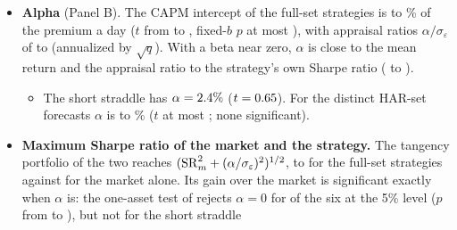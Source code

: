 \begin{itemize}
\begin{itemize}
  \item Over all days the full-set strategies are short the squared half-hour move, $\gamma$ from
    \rhebThirtyTmGammaFullMin{} to \rhebThirtyTmGammaFullMax{} ($t$ from \rhebThirtyTmGammaTFullMin{} to
    \rhebThirtyTmGammaTFullMax), against \rhebThirtyTmGammaShort{} ($t = \rhebThirtyTmGammaTShort$) for the short
    straddle, and they carry no slope on its sign ($\beta$ on $r^{30}_t$ with $t$ at most
    \rhebThirtyBetaTFullMax).
  \end{itemize}
\item \textbf{Alpha} (Panel B). The CAPM intercept of the full-set strategies is \rhebAlphaFullMin{} to
  \rhebAlphaFullMax\% of the premium a day ($t$ from \rhebAlphaTFullMin{} to \rhebAlphaTFullMax, fixed-$b$ $p$ at most
  \rhebAlphaPFullMax), with appraisal ratios $\alpha/\sigma_\varepsilon$ of \rhebARFullMin{} to \rhebARFullMax{}
  (annualized by $\sqrt{q}$). With a beta near zero, $\alpha$ is close to the mean return and the appraisal ratio
  to the strategy's own Sharpe ratio (\rhebSRsFullMin{} to \rhebSRsFullMax).
  \begin{itemize}
  \item The short straddle has $\alpha = 2.4\%$ ($t = 0.65$). For the
    \rhebNHarDistinctWord{} distinct HAR-set forecasts $\alpha$ is \rhebAlphaHarMin{} to \rhebAlphaHarMax\% ($t$ at
    most \rhebAlphaTHarMax; none significant).
  \end{itemize}
\item \textbf{Maximum Sharpe ratio of the market and the strategy.} The tangency portfolio of the two reaches
  $(\mathrm{SR}_m^2 + (\alpha/\sigma_\varepsilon)^2)^{1/2}$, \rhebSRmaxFullMin{} to \rhebSRmaxFullMax{} for the full-set
  strategies against \rhebSRm{} for the market alone. Its gain over the market is significant exactly when $\alpha$
  is: the one-asset test of \citet{GibbonsRossShanken1989} rejects $\alpha = 0$ for \rhebGrsSigFullWord{} of the six at
  the 5\% level ($p$ from \rhebGrsPFullMin{} to \rhebGrsPFullMax), but not for the short straddle

\end{itemize}
